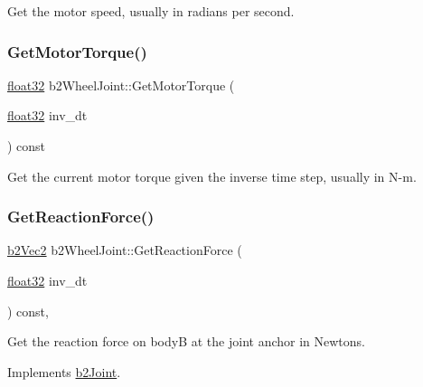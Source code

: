 Get the motor speed, usually in radians per second. 

\mbox{\label{classb2_wheel_joint_a635497eba904925e06fd5316ddec4539}} 
\subsubsection{\texorpdfstring{GetMotorTorque()}{GetMotorTorque()}}
{\footnotesize\ttfamily \mbox{\hyperlink{b2_settings_8h_aacdc525d6f7bddb3ae95d5c311bd06a1}{float32}} b2\+Wheel\+Joint\+::\+Get\+Motor\+Torque (\begin{DoxyParamCaption}\item[{\mbox{\hyperlink{b2_settings_8h_aacdc525d6f7bddb3ae95d5c311bd06a1}{float32}}}]{inv\+\_\+dt }\end{DoxyParamCaption}) const}



Get the current motor torque given the inverse time step, usually in N-\/m. 

\mbox{\label{classb2_wheel_joint_a93e34e700ce794db1acee07562027b2a}} 
\subsubsection{\texorpdfstring{GetReactionForce()}{GetReactionForce()}}
{\footnotesize\ttfamily \mbox{\hyperlink{structb2_vec2}{b2\+Vec2}} b2\+Wheel\+Joint\+::\+Get\+Reaction\+Force (\begin{DoxyParamCaption}\item[{\mbox{\hyperlink{b2_settings_8h_aacdc525d6f7bddb3ae95d5c311bd06a1}{float32}}}]{inv\+\_\+dt }\end{DoxyParamCaption}) const\hspace{0.3cm}{\ttfamily [override]}, {\ttfamily [virtual]}}



Get the reaction force on bodyB at the joint anchor in Newtons. 



Implements \mbox{\hyperlink{classb2_joint_a7e0eddefb9b69ad050b8ef6425838a74}{b2\+Joint}}.

\mbox{\label{classb2_wheel_joint_ad3317bb9856b105e4cb34d067316d7a8}} 
